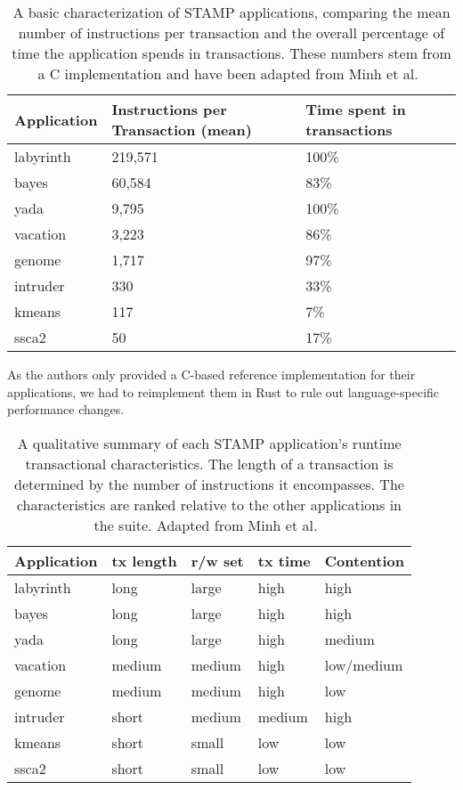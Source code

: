 \begin{table}
    \centering
    \begin{tabular}{|l|l|l|}
        \hline
        \textbf{Application} & \textbf{Instructions per Transaction} (mean) & \textbf{Time spent in transactions}\\\hline\hline
        labyrinth & 219,571 & 100\%\\\hline
        bayes & 60,584 & 83\%\\\hline
        yada & 9,795 & 100\%\\\hline
        vacation & 3,223 & 86\%\\\hline
        genome & 1,717 & 97\%\\\hline
        intruder & 330 & 33\%\\\hline
        kmeans & 117 & 7\%\\\hline
        ssca2 & 50 & 17\%\\\hline
    \end{tabular}
    \label{tab:experiments:overview}
    \caption{A basic characterization of STAMP applications, comparing the mean number of instructions per transaction and the overall percentage of time the application spends in transactions. These numbers stem from a C implementation and have been adapted from Minh et al.~\cite{minh2008stamp}}
\end{table}

As the authors only provided a C-based reference implementation for their applications, we had to reimplement them in Rust to rule out language-specific performance changes.

\begin{table}
    \centering
    \begin{tabular}{|l|l|l|l|l|}
        \hline
        \textbf{Application} & \textbf{tx length} & \textbf{r/w set} & \textbf{tx time} & \textbf{Contention}\\\hline\hline
        labyrinth & long & large & high & high\\\hline
        bayes & long & large & high & high\\\hline
        yada & long & large & high & medium\\\hline
        vacation & medium & medium & high & low/medium\\\hline
        genome & medium & medium & high & low\\\hline
        intruder & short & medium & medium & high\\\hline
        kmeans & short & small & low & low\\\hline
        ssca2 & short & small & low & low\\\hline
    \end{tabular}
    \label{tab:experiments:categorization}
    \caption{A qualitative summary of each STAMP application's runtime transactional characteristics. The length of a transaction is determined by the number of instructions it encompasses. The characteristics are ranked relative to the other applications in the suite. Adapted from Minh et al.~\cite{minh2008stamp}}
\end{table}

